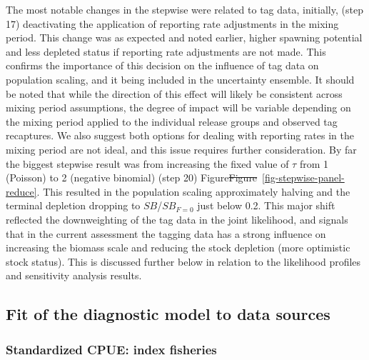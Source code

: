 \documentclass[
  english,
  a4paper,
  a4paper,
  11pt]{SCreport}
\providecommand{\DIFdel}[1]{{\protect\color{red}\sout{#1}}}                      %
\providecommand{\DIFdelbegin}{} %
\providecommand{\DIFdelend}{} %
\newcommand{\DIFscaledelfig}{0.5}
\newlength{\DIFdelgraphicswidth} %
\newlength{\DIFdelgraphicsheight} %
\newcommand{\DIFdelincludegraphics}[2][]{%
\sbox{\DIFdelgraphicsbox}{\DIFOincludegraphics[#1]{#2}}%
\settoboxwidth{\DIFdelgraphicswidth}{\DIFdelgraphicsbox} %
\settoboxtotalheight{\DIFdelgraphicsheight}{\DIFdelgraphicsbox} %
\scalebox{\DIFscaledelfig}{%
\parbox[b]{\DIFdelgraphicswidth}{\usebox{\DIFdelgraphicsbox}\\[-\baselineskip] \rule{\DIFdelgraphicswidth}{0em}}\llap{\resizebox{\DIFdelgraphicswidth}{\DIFdelgraphicsheight}{%
\setlength{\unitlength}{\DIFdelgraphicswidth}%
\begin{picture}(1,1)%
\thicklines\linethickness{2pt} %
{\color[rgb]{1,0,0}\put(0,0){\framebox(1,1){}}}%
{\color[rgb]{1,0,0}\put(0,0){\line( 1,1){1}}}%
{\color[rgb]{1,0,0}\put(0,1){\line(1,-1){1}}}%
\end{picture}%
}\hspace*{3pt}}} %
} %
\DeclareRobustCommand{\DIFdelbegin}{\DIFOdelbegin \let\includegraphics\DIFdelincludegraphics} %
\DeclareRobustCommand{\DIFdelend}{\DIFOaddend \let\includegraphics\DIFOincludegraphics} %
\begin{document}
The most notable changes in the stepwise were related to tag data,
initially, (step 17) deactivating the application of reporting rate
adjustments in the mixing period. This change was as expected and noted
earlier, higher spawning potential and less depleted status if reporting
rate adjustments are not made. This confirms the importance of this
decision on the influence of tag data on population scaling, and it
being included in the uncertainty ensemble. It should be noted that
while the direction of this effect will likely be consistent across
mixing period assumptions, the degree of impact will be variable
depending on the mixing period applied to the individual release groups
and observed tag recaptures. We also suggest both options for dealing
with reporting rates in the mixing period are not ideal, and this issue
requires further consideration. By far the biggest stepwise result was
from increasing the fixed value of \(\tau\) from 1 (Poisson) to 2
(negative binomial) (step 20) Figure\DIFdelbegin \DIFdel{Figure}\DIFdelend ~\ref{fig-stepwise-panel-reduce}.
This resulted in the population scaling approximately halving and the
terminal depletion dropping to \(SB\)/\(SB_{F=0}\) just below 0.2. This
major shift reflected the downweighting of the tag data in the joint
likelihood, and signals that in the current assessment the tagging data
has a strong influence on increasing the biomass scale and reducing the
stock depletion (more optimistic stock status). This is discussed
further below in relation to the likelihood profiles and sensitivity
analysis results.

\subsection{Fit of the diagnostic model to data
sources}\label{sec-fit-diag}

\subsubsection{Standardized CPUE: index fisheries}\label{sec-fit-cpue}
\end{document}
